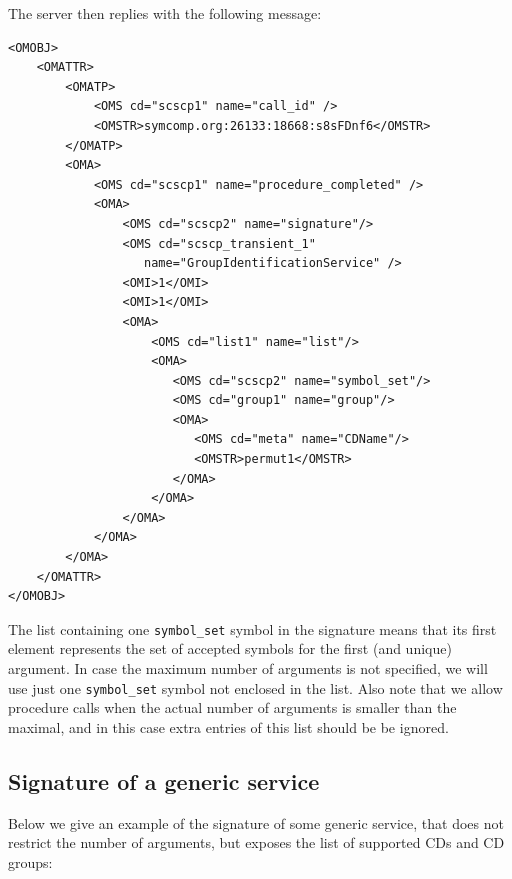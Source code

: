 \documentclass{amsart}
\begin{document}
The server then replies with the following message:

\begin{verbatim}
<OMOBJ>
    <OMATTR>
        <OMATP>
            <OMS cd="scscp1" name="call_id" />
            <OMSTR>symcomp.org:26133:18668:s8sFDnf6</OMSTR>
        </OMATP>        
        <OMA>
            <OMS cd="scscp1" name="procedure_completed" />
            <OMA> 
                <OMS cd="scscp2" name="signature"/>
                <OMS cd="scscp_transient_1" 
                   name="GroupIdentificationService" />
                <OMI>1</OMI>
                <OMI>1</OMI>
                <OMA>
                    <OMS cd="list1" name="list"/>
                    <OMA>
                       <OMS cd="scscp2" name="symbol_set"/>
                       <OMS cd="group1" name="group"/>
                       <OMA>
                          <OMS cd="meta" name="CDName"/>
                          <OMSTR>permut1</OMSTR>
                       </OMA> 
                    </OMA>                            
                </OMA>               
            </OMA>    
        </OMA>
    </OMATTR>
</OMOBJ>
\end{verbatim}

\vspace{10pt}

The list containing one \verb|symbol_set| symbol in the signature means 
that its first element represents the set of accepted symbols for the first
(and unique) argument. In case the maximum number of 
arguments is not specified, we will use just one \verb|symbol_set| symbol
not enclosed in the list.
Also note that we allow procedure calls when the actual number of arguments 
is smaller than the maximal, and in this case extra entries of this list should be
be ignored.

\vspace{15pt}

\subsection{Signature of a generic service}

Below we give an example of the signature of some generic service,
that does not restrict the number of arguments, but exposes the list 
of supported CDs and CD groups:
\end{document}
